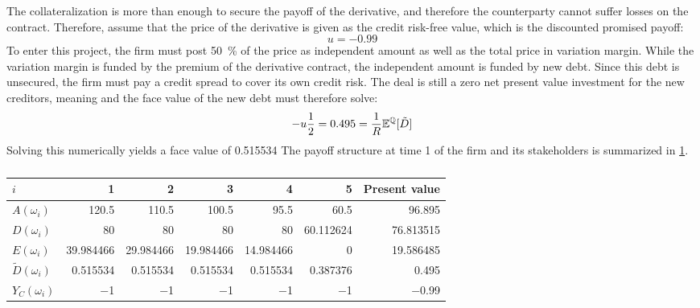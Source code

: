 \documentclass[../main.tex]{subfiles}
\begin{document}
        The collateralization is more than enough to secure the payoff of the derivative,
        and therefore the counterparty cannot suffer losses on the contract.
        Therefore, assume that the price of the derivative is given as the credit risk-free
        value, which is the discounted promised payoff:
            \begin{equation}
                u = \num{-0.99}
            \end{equation}
        To enter this project, the firm must post \qty[round-precision=0]{50}{\percent}
        of the price as independent amount as well as the total price in variation margin.
        While the variation margin is funded by the premium of the derivative contract, 
        the independent amount is funded by new debt. 
        Since this debt is unsecured, 
        the firm must pay a credit spread to cover its own credit risk. 
        The deal is still a zero net present value investment for the new creditors, 
        meaning and the face value of the new debt must therefore solve:
        \begin{equation}
            -
            u 
            \frac{1}{2} 
            = 
            \num{0.495}
            =
            \frac{1}{R}
            \mathbb{E}^{\mathbb{Q}}[\tilde{D}]
        \end{equation}
        Solving this numerically yields a face value of \num{0.515534}
        The payoff structure at time 1 of the firm and its stakeholders
        is summarized in \cref{tbl:example-collateralized-derivative}.

        \begin{table}[H]
            \centering
            \begin{tabular}{l|rrrrr||r}
                $i$ & 1 & 2 & 3 & 4 & 5 & Present value \\
                \hline
                $A(\omega_{i})$ & 
                    \num{120.5} & \num{110.5} & \num{100.5} & \num{95.5} & \num{60.5} & \num{96.895} \\
                $D(\omega_{i})$ & 
                    \num{80} & \num{80} & \num{80} & \num{80} & \num{60.112624} & \num{76.813515} \\
                $E(\omega_{i})$ & 
                    \num{39.984466} & \num{29.984466} & \num{19.984466} & \num{14.984466} & \num{0} & \num{19.586485}\\
                $\tilde{D}(\omega_{i})$ & 
                    \num{0.515534} & \num{0.515534} & \num{0.515534} & \num{0.515534} & \num{0.387376} & \num{0.495}\\
                $Y_C(\omega_{i})$ & 
                    \num{-1} & \num{-1} & \num{-1} & \num{-1} & \num{-1} & \num{-0.99} \\
            \end{tabular}
            \caption{}
            \label{tbl:example-collateralized-derivative}
        \end{table}
\end{document}
